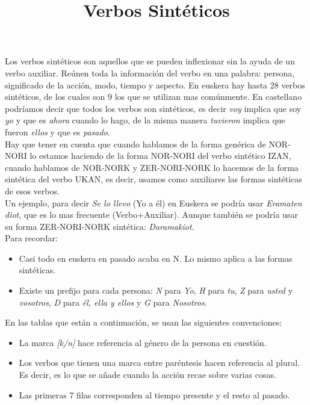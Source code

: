 \documentclass[11pt, a4paper]{article}
\begin{document}
\date{}
\title{Verbos Sintéticos\\}
\maketitle

Los verbos sintéticos son aquellos que se pueden inflexionar sin la ayuda de un verbo auxiliar. Reúnen toda la información del verbo en una palabra: persona, significado de la acción, modo, tiempo y aspecto. En euskera hay hasta 28 verbos sintéticos, de los cuales son 9 los que se utilizan mas comúnmente. En castellano podríamos decir que todos los verbos son sintéticos, es decir \textit{voy} implica que soy \textit{yo} y que es \textit{ahora} cuando lo hago, de la misma manera \textit{tuvieron} implica que fueron \textit{ellos} y que es \textit{pasado}.\\

Hay que tener en cuenta que cuando hablamos de la forma genérica de NOR-NORI lo estamos haciendo de la forma NOR-NORI del verbo sintético IZAN, cuando hablamos de NOR-NORK y ZER-NORI-NORK lo hacemos de la forma sintética del verbo UKAN, es decir, usamos como auxiliares las formas sintéticas de esos verbos.\\

Un ejemplo, para decir \textit{Se lo llevo} (Yo a él) en Euskera se podría usar \textit{Eramaten diot}, que es lo mas frecuente (Verbo+Auxiliar). Aunque también se podría usar su forma ZER-NORI-NORK sintética: \textit{Daramakiot}.\\

Para recordar:
\begin{itemize}
	\item Casi todo en euskera en pasado acaba en N. Lo mismo aplica a las formas sintéticas.
	\item Existe un prefijo para cada persona: \textit{N} para \textit{Yo}, \textit{H} para \textit{tu}, \textit{Z} para \textit{usted} y \textit{vosotros}, \textit{D} para \textit{él, ella y ellos} y \textit{G} para \textit{Nosotros}.\\
\end{itemize}

En las tablas que están a continuación, se usan las siguientes convenciones:
\begin{itemize}
	\item La marca \textit{[k/n]} hace referencia al género de la persona en cuestión.
	\item Los verbos que tienen una marca entre paréntesis hacen referencia al plural. Es decir, es lo que se añade cuando la acción recae sobre varias cosas.
	\item Las primeras 7 filas corresponden al tiempo presente y el resto al pasado.
\end{itemize}
\end{document}
